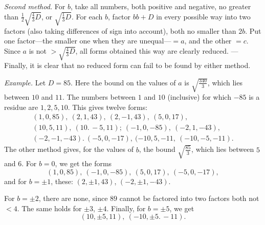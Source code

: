 \emph{Second method.} For $b$, take all numbers, both positive and negative, no greater than $\frac12\surd{\frac43 D}$, or $\surd{\frac13 D}$. For each $b$, factor $bb+D$ in every possible way into two factors (also taking differences of sign into account), both no smaller than $2b$. Put one factor---the smaller one when they are unequal---$=a$, and the other $=c$. Since $a$ is not $>\surd{\frac43 D}$, all forms obtained this way are clearly reduced. --- Finally, it is clear that no reduced form can fail to be found by either method.

\emph{Example.} Let $D=85$. Here the bound on the values of $a$ is $\surd{\frac{340}{3}}$, which lies between $10$ and $11$. The numbers between $1$ and $10$ (inclusive) for which $-85$ is a residue are $1,2,5,10$. This gives twelve forms:
\[
\begin{gathered}
(1,0,85),\ (2,1,43),\ (2,-1,43),\ (5,0,17),\\
(10,5,11),\ (10.\,-5,11);\ (-1,0,-85),\ (-2,1,-43),\\
(-2,-1,-43).\ (-5,0,-17),\ (-10,5,-11,\ (-10,-5,-11).
\end{gathered}
\]
The other method gives, for the values of $b$, the bound $\surd{\frac{85}{3}}$, which lies between $5$ and $6$. For $b=0$, we get the forms
\[
(1,0,85),\ (-1,0,-85),\ (5,0,17),\ (-5,0,-17),
\]
and for $b=\pm1$, these: $(2,\pm1,43)$, $(-2,\pm1,-43)$.

For $b=\pm2$, there are none, since $89$ cannot be factored into two factors both not $<4$. The same holds for $\pm3$, $\pm4$. Finally, for $b=\pm5$, we get
\[
(10,\pm5,11),\ (-10,\pm5.\,-11).
\]

